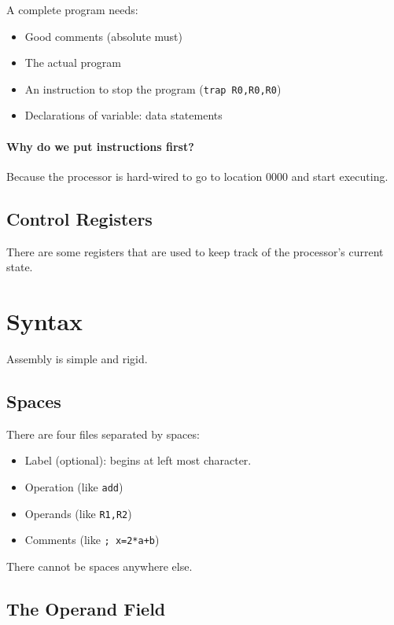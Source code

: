 A complete program needs:
\begin{itemize}
    \item Good comments (absolute must)
    \item The actual program
    \item An instruction to stop the program (\texttt{trap R0,R0,R0})
    \item Declarations of variable: data statements
\end{itemize}

\paragraph{Why do we put instructions first?}
Because the processor is hard-wired to go to location \(0000\) and start executing.

\subsection{Control Registers}\label{sub:control_registers}

There are some registers that are used to keep track of the processor's current state.

\section{Syntax}\label{sec:syntax}

Assembly is simple and rigid.

\subsection{Spaces}\label{sub:spaces}

There are four files separated by spaces:
\begin{itemize}
    \item Label (optional): begins at left most character.
    \item Operation (like \texttt{add})
    \item Operands (like \texttt{R1,R2})
    \item Comments (like \texttt{; x=2*a+b})
\end{itemize}

\begin{note}
    There cannot be spaces anywhere else.
\end{note}

\subsection{The Operand Field}\label{sub:the_operand_field}

